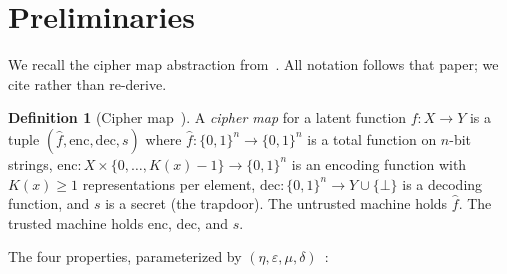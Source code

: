 \documentclass[conference]{IEEEtran}
\theoremstyle{definition}
\newtheorem{definition}{Definition}[section]
\theoremstyle{plain}
\theoremstyle{remark}
\newcommand{\fhat}{\hat{f}}
\newcommand{\enc}{\mathrm{enc}}
\newcommand{\dec}{\mathrm{dec}}
\newcommand{\B}{\{0,1\}}
\begin{document}
\section{Preliminaries}
\label{sec:prelim}

We recall the cipher map abstraction from~\cite{towell2026cipher}.  All
notation follows that paper; we cite rather than re-derive.

\begin{definition}[Cipher map~{\cite[Def.~3.1]{towell2026cipher}}]
\label{def:cipher-map}
A \emph{cipher map} for a latent function $f : X \to Y$ is a tuple
$(\fhat, \enc, \dec, s)$ where $\fhat : \B^n \to \B^n$ is a total
function on $n$-bit strings, $\enc : X \times \{0,\ldots,K(x){-}1\}
\to \B^n$ is an encoding function with $K(x) \geq 1$ representations
per element, $\dec : \B^n \to Y \cup \{\bot\}$ is a decoding function,
and $s$ is a secret (the trapdoor).  The untrusted machine holds $\fhat$.
The trusted machine holds $\enc$, $\dec$, and $s$.
\end{definition}

The four properties, parameterized by
$(\eta, \varepsilon, \mu, \delta)$~\cite[Sec.~4]{towell2026cipher}:
\end{document}
